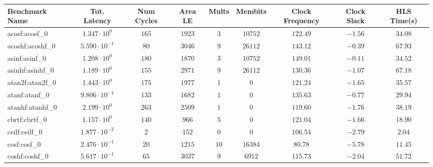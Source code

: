 \begin{tabular}{|l|c|c|c|c|c|c|c|c|}
\hline
Benchmark Name               & Tot. Latency            & Num Cycles & Area LE   & Mults   & Membits    & Clock Frequency & Clock Slack & HLS Time(s) \\
\hline
acosf:acosf\_0               & $ 1.347 \cdot 10^{0}  $ & $ 165    $ & $ 1923  $ & $ 3   $ & $ 10752  $ & $ 122.49      $ & $ -1.56   $ & $ 34.08   $ \\
acoshf:acoshf\_0             & $ 5.590 \cdot 10^{-1} $ & $ 80     $ & $ 3046  $ & $ 9   $ & $ 26112  $ & $ 143.12      $ & $ -0.39   $ & $ 67.93   $ \\
asinf:asinf\_0               & $ 1.208 \cdot 10^{0}  $ & $ 180    $ & $ 1870  $ & $ 3   $ & $ 10752  $ & $ 149.01      $ & $ -0.11   $ & $ 34.52   $ \\
asinhf:asinhf\_0             & $ 1.189 \cdot 10^{0}  $ & $ 155    $ & $ 2971  $ & $ 9   $ & $ 26112  $ & $ 130.36      $ & $ -1.07   $ & $ 67.18   $ \\
atan2f:atan2f\_0             & $ 1.443 \cdot 10^{0}  $ & $ 175    $ & $ 1977  $ & $ 1   $ & $ 0      $ & $ 121.24      $ & $ -1.65   $ & $ 35.57   $ \\
atanf:atanf\_0               & $ 9.806 \cdot 10^{-1} $ & $ 133    $ & $ 1682  $ & $ 1   $ & $ 0      $ & $ 135.63      $ & $ -0.77   $ & $ 29.94   $ \\
atanhf:atanhf\_0             & $ 2.199 \cdot 10^{0}  $ & $ 263    $ & $ 2509  $ & $ 1   $ & $ 0      $ & $ 119.60      $ & $ -1.76   $ & $ 38.19   $ \\
cbrtf:cbrtf\_0               & $ 1.157 \cdot 10^{0}  $ & $ 140    $ & $ 966   $ & $ 5   $ & $ 0      $ & $ 121.04      $ & $ -1.66   $ & $ 18.90   $ \\
ceilf:ceilf\_0               & $ 1.877 \cdot 10^{-2} $ & $ 2      $ & $ 152   $ & $ 0   $ & $ 0      $ & $ 106.54      $ & $ -2.79   $ & $ 2.04    $ \\
cosf:cosf\_0                 & $ 2.476 \cdot 10^{-1} $ & $ 20     $ & $ 1215  $ & $ 10  $ & $ 16384  $ & $ 80.78       $ & $ -5.78   $ & $ 11.45   $ \\
coshf:coshf\_0               & $ 5.617 \cdot 10^{-1} $ & $ 65     $ & $ 3037  $ & $ 9   $ & $ 6912   $ & $ 115.73      $ & $ -2.04   $ & $ 51.72   $ \\

\end{tabular}
